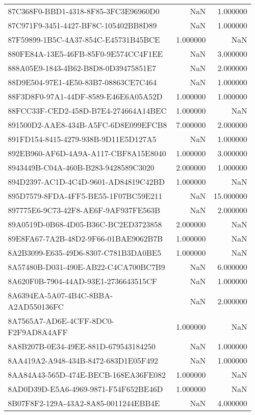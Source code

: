 \begin{tabular}{lrr}
87C368F0-BBD1-4318-8F85-3FC3E96960D0 & NaN & 1.000000 \\
87C971F9-3451-4427-BF8C-105402BB8D89 & NaN & 1.000000 \\
87F59899-1B5C-4A37-854C-E45731B45BCE & 1.000000 & NaN \\
880FE84A-13E5-46FB-85F0-9E574CC4F1EE & NaN & 3.000000 \\
888A05E9-1843-4B62-B8D8-0D39475851E7 & NaN & 2.000000 \\
88D9E504-97E1-4E50-83B7-08863CE7C464 & NaN & 1.000000 \\
88F3D8F0-97A1-44DF-8589-E46E6A05A52D & 1.000000 & 1.000000 \\
88FCC33F-CED2-458D-B7E4-274664A14BEC & 1.000000 & NaN \\
891500D2-AAE8-434B-A5FC-6D8E099EFCB8 & 7.000000 & 2.000000 \\
891FD154-8415-4279-938B-9D11E5D127A5 & NaN & 1.000000 \\
892EB960-AF6D-4A9A-A117-CBF8A15E8040 & 1.000000 & 3.000000 \\
8943449B-C04A-460B-B283-9428589C3020 & 2.000000 & 1.000000 \\
894D2397-AC1D-4C4D-9601-AD84819C42BD & 1.000000 & NaN \\
895D7579-8FDA-4FF5-BE55-1F07BC59E211 & NaN & 15.000000 \\
897775E6-9C73-42F8-AE6F-9AF937FE563B & NaN & 2.000000 \\
89A0519D-0B68-4D05-B36C-BC2ED3723858 & 2.000000 & NaN \\
89E8FA67-7A2B-48D2-9F66-01BAE9062B7B & 1.000000 & NaN \\
8A2B3099-E635-49D6-8307-C781B3DA0BE5 & 1.000000 & NaN \\
8A57480B-D031-490E-AB22-C4CA700BC7B9 & NaN & 6.000000 \\
8A620F0B-7904-44AD-93E1-2736643515CF & NaN & 1.000000 \\
8A6394EA-5A07-4B4C-8BBA-A2AD550136FC & NaN & 2.000000 \\
8A7565A7-AD6E-4CFF-8DC0-F2F9AD8A4AFF & 1.000000 & NaN \\
8A8B207B-0E34-49EE-881D-679543184250 & NaN & 1.000000 \\
8AA419A2-A948-434B-8472-683D1E05F492 & NaN & 1.000000 \\
8AA84A43-565D-474E-BECB-168EA36FE082 & 1.000000 & NaN \\
8AD0D39D-E5A6-4969-9871-F54F652BE46D & 1.000000 & NaN \\
8B07F8F2-129A-43A2-8A85-0011244EBB4E & NaN & 4.000000 \\

\end{tabular}
